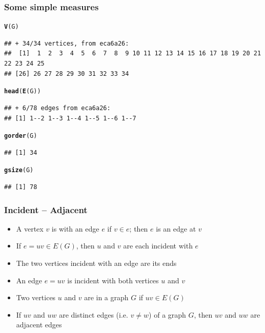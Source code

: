 \documentclass[aspectratio=169]{beamer}\usepackage[]{graphicx}\usepackage[]{xcolor}
\makeatletter
\newcommand{\hldef}[1]{\textcolor[rgb]{0.345,0.345,0.345}{#1}}%
\newcommand{\hlkwd}[1]{\textcolor[rgb]{0.737,0.353,0.396}{\textbf{#1}}}%
\newenvironment{kframe}{%
 \def\at@end@of@kframe{}%
 \ifinner\ifhmode%
  \def\at@end@of@kframe{\end{minipage}}%
  \begin{minipage}{\columnwidth}%
 \fi\fi%
 \def\FrameCommand##1{\hskip\@totalleftmargin \hskip-\fboxsep
 \colorbox{shadecolor}{##1}\hskip-\fboxsep
     \hskip-\linewidth \hskip-\@totalleftmargin \hskip\columnwidth}%
 \MakeFramed {\advance\hsize-\width
   \@totalleftmargin\z@ \linewidth\hsize
   \@setminipage}}%
 {\par\unskip\endMakeFramed%
 \at@end@of@kframe}
\newenvironment{knitrout}{}{} %
\makeatother
\begin{document}
\begin{frame}[fragile]\frametitle{Some simple measures}
\begin{knitrout}
\color{fgcolor}\begin{kframe}
\begin{alltt}
\hlkwd{V}\hldef{(G)}
\end{alltt}
\begin{verbatim}
## + 34/34 vertices, from eca6a26:
##  [1]  1  2  3  4  5  6  7  8  9 10 11 12 13 14 15 16 17 18 19 20 21 22 23 24 25
## [26] 26 27 28 29 30 31 32 33 34
\end{verbatim}
\begin{alltt}
\hlkwd{head}\hldef{(}\hlkwd{E}\hldef{(G))}
\end{alltt}
\begin{verbatim}
## + 6/78 edges from eca6a26:
## [1] 1--2 1--3 1--4 1--5 1--6 1--7
\end{verbatim}
\begin{alltt}
\hlkwd{gorder}\hldef{(G)}
\end{alltt}
\begin{verbatim}
## [1] 34
\end{verbatim}
\begin{alltt}
\hlkwd{gsize}\hldef{(G)}
\end{alltt}
\begin{verbatim}
## [1] 78
\end{verbatim}
\end{kframe}
\end{knitrout}
\end{frame}

\begin{frame}\frametitle{Incident -- Adjacent}
	\begin{definition}[Incident]
	\begin{itemize}
	\item A vertex $v$ is  with an edge $e$ if $v\in e$; then $e$ is an edge at $v$
	\item If $e=uv\in E(G)$, then $u$ and $v$ are each incident with $e$
	\item The two vertices incident with an edge are its ends
	\item An edge $e=uv$ is incident with both vertices $u$ and $v$
	\end{itemize}
	\end{definition}
	\vfill
	\begin{definition}[Adjacent]
	\begin{itemize}
	\item Two vertices $u$ and $v$ are  in a graph $G$ if $uv\in E(G)$
	\item If $uv$ and $uw$ are distinct edges (i.e. $v\not=w$) of a graph $G$, then $uv$ and $uw$ are adjacent edges
	\end{itemize}
	\end{definition}
\end{frame}
\end{document}
